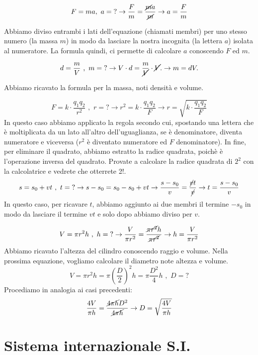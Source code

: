 	\[F= ma, \,\,  a = \text{?} \rightarrow \frac{F}{m} =\frac{\cancel{m} a}{\cancel{m}}\rightarrow a=\frac{F}{m}
	\]

 Abbiamo diviso entrambi i lati dell'equazione (chiamati membri) per uno stesso numero (la massa $m$) in modo da lasciare la nostra incognita (la lettera $a$) isolata al numeratore. La formula quindi, ci permette di calcolare $a$ conoscendo $F$ ed $m$.

\[
d=\frac{m}{V} \,\,\text{,}\,\,\,  m=\text{?} \rightarrow  V\cdot  d = \frac{m}{\cancel{V}}\cdot \cancel{V}.\rightarrow m = d V.
\]

Abbiamo ricavato la formula per la massa, noti densità e volume.

\[
F=k\cdot \frac{q_1 q_2}{r^2} \,\,\text{,}\,\,\,  r=\text{?} \rightarrow r^2 = k\cdot \frac{q_1 q_2}{F}\rightarrow r=\sqrt{k\cdot \frac{q_1 q_2}{F}}
\]
In questo caso abbiamo applicato la regola secondo cui, spostando una lettera che è moltiplicata da un lato all'altro dell'uguaglianza, se è denominatore, diventa numeratore e viceversa ($r^2$ è diventato numeratore ed $F$ denominatore). In fine, per eliminare il quadrato, abbiamo estratto la radice quadrata, poichè è l'operazione inversa del quadrato. Provate a calcolare la radice quadrata di $2^2$ con la calcolatrice e vedrete che otterrete 2!.
\[
s= s_0 + v t \,\,\text{,}\,\,\,  t=\text{?} \rightarrow s-s_0 = s_0 -s_0 + v t\rightarrow \frac{s-s_0}{v} = \frac{\cancel{v} t }{\cancel{v}}\rightarrow t=\frac{s-s_0}{v}
\]
In questo caso, per ricavare $t$, abbiamo aggiunto ai due membri il termine $-s_0$ in modo da lasciare il termine $v t$ e solo dopo abbiamo diviso per $v$.


\[
V=\pi r^2 h \,\,\text{,}\,\,\,  h=\text{?} \rightarrow \frac{V}{\pi r^2} = \frac{\cancel{ \pi r^2} h}{\cancel{\pi r^2}} \rightarrow h= \frac{V}{\pi r^2 }
\]
Abbiamo ricavato l'altezza del cilindro conoscendo raggio e volume. Nella prossima equazione, vogliamo calcolare il diametro note altezza e volume.
\[
V=\pi r^2 h =\pi \left(\frac{D}{2} \right)^2 h= \pi \frac{D^2}{4}  h\,\,\text{,}\,\,\,  D=\text{?} 
\]
Procediamo in analogia ai casi precedenti:
\[
\frac{4 V}{\pi h} = \frac{ \cancel{ 4 \pi h }D^2 }{ \cancel{4 \pi h}} \rightarrow D=\sqrt{\frac{4 V}{\pi h}}
\]




\section{Sistema internazionale S.I.}

